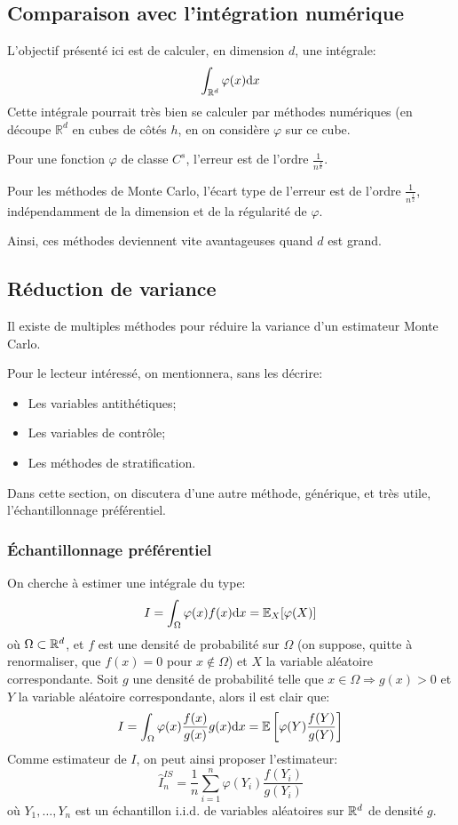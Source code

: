 \subsection{Comparaison avec l'intégration numérique}

L'objectif présenté ici est de calculer, en dimension $d$, une intégrale:
$$\int_{\mathbb{R}^d} \varphi(x) \text{d} x$$
Cette intégrale pourrait très bien se calculer par méthodes numériques (en découpe $\mathbb{R}^d$ en cubes de côtés $h$, en on considère $\varphi$ sur ce cube.

Pour une fonction $\varphi$ de classe $C^s$, l'erreur est de l'ordre $\frac{1}{n^{\frac{s}{d}}}$.

Pour les méthodes de Monte Carlo, l'écart type de l'erreur est de l'ordre $\frac{1}{n^{\frac{1}{2}}}$, indépendamment de la dimension et de la régularité de $\varphi$.

Ainsi, ces méthodes deviennent vite avantageuses quand $d$ est grand.

\subsection{Réduction de variance}

Il existe de multiples méthodes pour réduire la variance d'un estimateur Monte Carlo.

Pour le lecteur intéressé, on mentionnera, sans les décrire:
\begin{itemize}
\item Les variables antithétiques;
\item Les variables de contrôle;
\item Les méthodes de stratification.
\end{itemize}

Dans cette section, on discutera d'une autre méthode, générique, et très utile, l'échantillonnage préférentiel.

\subsubsection{Échantillonnage préférentiel}

On cherche à estimer une intégrale du type:
$$I = \int_{\Omega} \varphi(x) f(x)\text{d} x = \mathbb{E}_X[\varphi(X)]$$
où $\Omega \subset \mathbb{R}^d$, et $f$ est une densité de probabilité sur $\Omega$ (on suppose, quitte à renormaliser, que $f(x) = 0$ pour $x \not\in \Omega$) et $X$ la variable aléatoire correspondante. 
Soit $g$ une densité de probabilité telle que $x\in \Omega \Rightarrow g(x) > 0$ et $Y$ la variable aléatoire correspondante, alors il est clair que:
$$I =  \int_{\Omega} \varphi(x) \frac{f(x)}{g(x)}g(x)\text{d} x = \mathbb{E}\left[\varphi(Y) \frac{f(Y)}{g(Y)}\right]$$
Comme estimateur de $I$, on peut ainsi proposer l'estimateur:
$$\hat{I}^{IS}_n = \frac{1}{n}\sum_{i = 1}^n \varphi(Y_i) \frac{f(Y_i)}{g(Y_i)}$$
où $Y_1,\dots,Y_n$ est un échantillon i.i.d. de variables aléatoires sur $\mathbb{R}^d$ de densité $g$.

